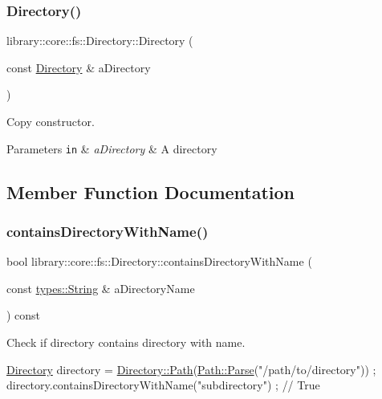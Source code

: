 \subsubsection{\texorpdfstring{Directory()}{Directory()}\hspace{0.1cm}{\footnotesize\ttfamily [2/2]}}
{\footnotesize\ttfamily library\+::core\+::fs\+::\+Directory\+::\+Directory (\begin{DoxyParamCaption}\item[{const \hyperlink{classlibrary_1_1core_1_1fs_1_1Directory}{Directory} \&}]{a\+Directory }\end{DoxyParamCaption})}



Copy constructor. 


\begin{DoxyParams}[1]{Parameters}
\mbox{\tt in}  & {\em a\+Directory} & A directory \\
\hline
\end{DoxyParams}


\subsection{Member Function Documentation}
\mbox{\label{classlibrary_1_1core_1_1fs_1_1Directory_abf702bc8f107d3e4eefe15579861b8e3}} 
\subsubsection{\texorpdfstring{contains\+Directory\+With\+Name()}{containsDirectoryWithName()}}
{\footnotesize\ttfamily bool library\+::core\+::fs\+::\+Directory\+::contains\+Directory\+With\+Name (\begin{DoxyParamCaption}\item[{const \hyperlink{classlibrary_1_1core_1_1types_1_1String}{types\+::\+String} \&}]{a\+Directory\+Name }\end{DoxyParamCaption}) const}



Check if directory contains directory with name. 


\begin{DoxyCode}
\hyperlink{classlibrary_1_1core_1_1fs_1_1Directory_a3ec39f6cad19a81d520e9a1f2d8bb1f7}{Directory} directory = \hyperlink{classlibrary_1_1core_1_1fs_1_1Directory_a6d3ea04654841e62a4dbd99feb563caf}{Directory::Path}(\hyperlink{classlibrary_1_1core_1_1fs_1_1Path_aebf5bd3af83e0b7376616e146f3e55df}{Path::Parse}(\textcolor{stringliteral}{"/path/to/directory"}))
       ;
directory.containsDirectoryWithName(\textcolor{stringliteral}{"subdirectory"}) ; \textcolor{comment}{// True}
\end{DoxyCode}


